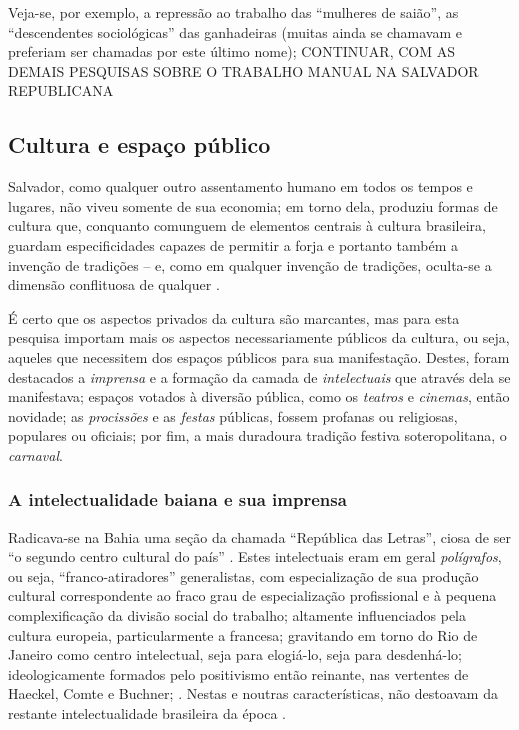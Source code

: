 Veja-se, por exemplo, a repressão ao trabalho das ``mulheres de saião'', as ``descendentes sociológicas'' das ganhadeiras (muitas ainda se chamavam e preferiam ser chamadas por este último nome); \cite{barbosa2009} CONTINUAR, COM AS DEMAIS PESQUISAS SOBRE O TRABALHO MANUAL NA SALVADOR REPUBLICANA

\subsection{Cultura e espaço público}\label{subsec:cultespubsaba}

Salvador, como qualquer outro assentamento humano em todos os tempos e lugares, não viveu somente de sua economia; em torno dela, produziu formas de cultura que, conquanto comunguem de elementos centrais à cultura brasileira, guardam especificidades capazes de permitir a forja e portanto também a invenção de tradições -- e, como em qualquer invenção de tradições, oculta-se a dimensão conflituosa de qualquer  \cite{mariano_baianidade_2009,pinho_baianidade_1998}.

É certo que os aspectos privados da cultura são marcantes, mas para esta pesquisa importam mais os aspectos necessariamente públicos da cultura, ou seja, aqueles que necessitem dos espaços públicos para sua manifestação. Destes, foram destacados a \textit{imprensa} e a formação da camada de \textit{intelectuais} que através dela se manifestava; espaços votados à diversão pública, como os \textit{teatros} e \textit{cinemas}, então novidade; as \textit{procissões} e as \textit{festas} públicas, fossem profanas ou religiosas, populares ou oficiais; por fim, a mais duradoura tradição festiva soteropolitana, o \textit{carnaval}.

\subsubsection{A intelectualidade baiana e sua imprensa}\label{subsubsec:intimpbasa}

Radicava-se na Bahia uma seção da chamada ``República das Letras'', ciosa de ser ``o segundo centro cultural do país'' \cite[p.~263]{machadoneto_bahiaint_1972}. Estes intelectuais eram em geral \textit{polígrafos}, ou seja, ``franco-atiradores'' generalistas, com especialização de sua produção cultural correspondente ao fraco grau de especialização profissional e à pequena complexificação da divisão social do trabalho; altamente influenciados pela cultura europeia, particularmente a francesa; gravitando em torno do Rio de Janeiro como centro intelectual, seja para elogiá-lo, seja para desdenhá-lo; ideologicamente formados pelo positivismo então reinante, nas vertentes de Haeckel, Comte e Buchner;  \cite{MachadoNeto1966,machadoneto_bahiaint_1972}.  Nestas e noutras características, não destoavam da restante intelectualidade brasileira da época \cite{martins_intelv5_1977,martins_intelv6_1978}.

